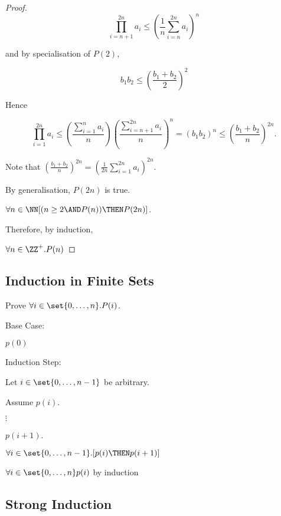 \documentclass[11pt]{scrartcl}
\begin{document}
\begin{proof}
  \begin{equation*}
    \prod_{i=n+1}^{2n}a_i\leq (\frac{1}{n}\sum_{i=n}^{2n}a_i)^n
  \end{equation*}

  and by specialisation of $P(2)$,

  \begin{equation*}
    b_1b_2\leq (\frac{b_1+b_2}{2})^2
  \end{equation*}

  Hence

  \begin{equation*}
  \prod_{i=1}^{2n}a_i \leq (\frac{\sum_{i=1}^na_i}{n})(\frac{\sum_{i=n+1}^{2n}a_i}{n})^n=(b_1b_2)^n\leq(\frac{b_1+b_2}{n})^{2n}.
\end{equation*}

Note that $(\frac{b_1+b_2}{n})^{2n} = (\frac{1}{2n}\sum_{i=1}^{2n}a_i)^{2n}$.

By generalisation, $P(2n)$ is true.

$\forall n\in\NN[(n\geq 2 \AND P(n))\THEN P(2n)]$.

Therefore, by induction,

$\forall n\in\ZZ^+.P(n)$
\end{proof}
\subsection{Induction in Finite Sets}

\begin{problem*}
Prove $\forall i\in\set{0, \dots, n}.P(i)$.
\end{problem*}

\begin{soln}
  Base Case:

  $p(0)$

  Induction Step:

  Let $i\in\set{0, \dots, n-1}$ be arbitrary.

  Assume $p(i)$.

  $\vdots$

  $p(i+1)$.

  $\forall i\in \set{0, \dots, n-1}.[p(i) \THEN p(i+1)]$

  $\forall i\in\set{0, \dots, n} p(i)$ by induction
  
\end{soln}

\subsection{Strong Induction}
\end{document}
